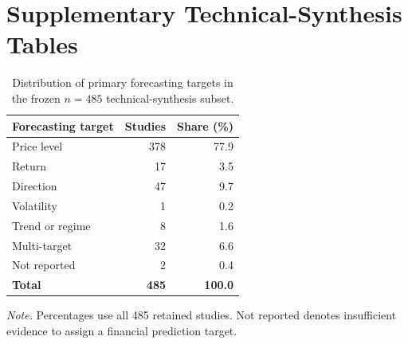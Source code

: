 \documentclass[12pt]{article}
\numberwithin{equation}{section}
\begin{document}
\FloatBarrier
\section{Supplementary Technical-Synthesis Tables}
\label{sec:supp-technical-synthesis-tables}
\begin{table}[!htbp]
\centering
\caption{Distribution of primary forecasting targets in the frozen $n=485$ technical-synthesis subset.}
\label{tab:supp-target-distribution}
\small
\setlength{\tabcolsep}{4pt}
\renewcommand{\arraystretch}{1.12}
\begin{tabular}{lrr}
\toprule
Forecasting target & Studies & Share (\%) \\
\midrule
Price level & 378 & 77.9 \\
Return & 17 & 3.5 \\
Direction & 47 & 9.7 \\
Volatility & 1 & 0.2 \\
Trend or regime & 8 & 1.6 \\
Multi-target & 32 & 6.6 \\
Not reported & 2 & 0.4 \\
\textbf{Total} & \textbf{485} & \textbf{100.0} \\
\bottomrule
\end{tabular}

\vspace{1mm}
\begin{minipage}{0.97\linewidth}
\footnotesize
\textit{Note.} Percentages use all 485 retained studies. Not reported denotes insufficient evidence to assign a financial prediction target.
\end{minipage}
\end{table}

\FloatBarrier
\end{document}
